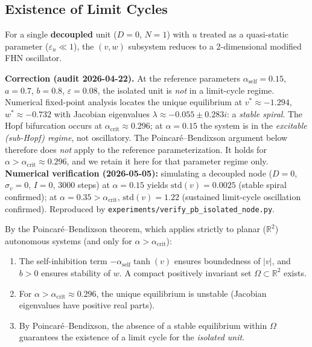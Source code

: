 ﻿\documentclass[11pt]{article}
\begin{document}
\subsection{Existence of Limit Cycles}

For a single \textbf{decoupled} unit ($D = 0$, $N = 1$) with $u$ treated as a quasi-static parameter ($\varepsilon_u \ll 1$), the $(v, w)$ subsystem reduces to a 2-dimensional modified FHN oscillator.

\textbf{Correction (audit 2026-04-22).} At the reference parameters $\alpha_{\text{self}} = 0.15$, $a = 0.7$, $b = 0.8$, $\varepsilon = 0.08$, the isolated unit is \emph{not} in a limit-cycle regime. Numerical fixed-point analysis locates the unique equilibrium at $v^* \approx -1.294$, $w^* \approx -0.732$ with Jacobian eigenvalues $\lambda \approx -0.055 \pm 0.283i$: a \textit{stable spiral}. The Hopf bifurcation occurs at $\alpha_{\text{crit}} \approx 0.296$; at $\alpha = 0.15$ the system is in the \textit{excitable (sub-Hopf) regime}, not oscillatory. The Poincar\'e--Bendixson argument below therefore does \emph{not} apply to the reference parameterization. It holds for $\alpha > \alpha_{\text{crit}} \approx 0.296$, and we retain it here for that parameter regime only. \textbf{Numerical verification (2026-05-05):} simulating a decoupled node ($D = 0$, $\sigma_v = 0$, $I = 0$, 3000 steps) at $\alpha = 0.15$ yields $\mathrm{std}(v) = 0.0025$ (stable spiral confirmed); at $\alpha = 0.35 > \alpha_{\text{crit}}$, $\mathrm{std}(v) = 1.22$ (sustained limit-cycle oscillation confirmed). Reproduced by \texttt{experiments/verify\_pb\_isolated\_node.py}.

By the Poincar\'e--Bendixson theorem, which applies strictly to planar ($\mathbb{R}^2$) autonomous systems (and only for $\alpha > \alpha_{\text{crit}}$):
\begin{enumerate}
\item The self-inhibition term $-\alpha_{\text{self}} \tanh(v)$ ensures boundedness of $|v|$, and $b > 0$ ensures stability of $w$. A compact positively invariant set $\Omega \subset \mathbb{R}^2$ exists.
\item For $\alpha > \alpha_{\text{crit}} \approx 0.296$, the unique equilibrium is unstable (Jacobian eigenvalues have positive real parts).
\item By Poincar\'e--Bendixson, the absence of a stable equilibrium within $\Omega$ guarantees the existence of a limit cycle for the \emph{isolated unit}.
\end{enumerate}
\end{document}
